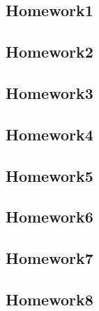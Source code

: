 \documentclass[../main.tex]{subfiles}
\begin{document}
\subsection{Homework1}

\newpage

\subsection{Homework2}

\newpage

\subsection{Homework3}

\newpage

\subsection{Homework4}

\newpage

\subsection{Homework5}

\newpage

\subsection{Homework6}

\newpage

\subsection{Homework7}

\newpage

\subsection{Homework8}

\newpage
\end{document}
